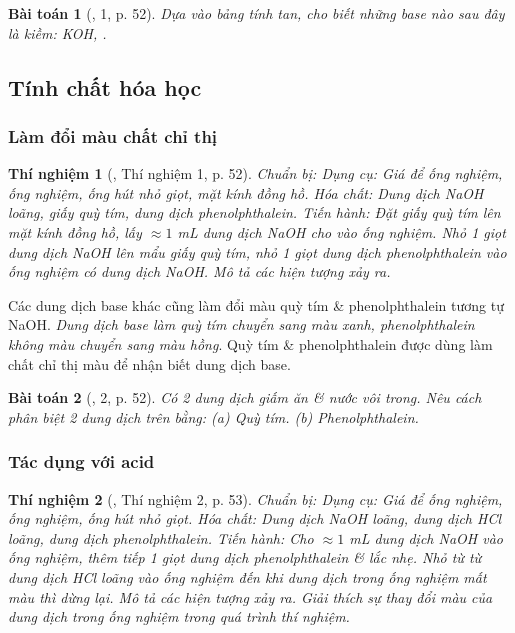 \documentclass{article}
\newtheorem{baitoan}{Bài toán}
\newtheorem{thinghiem}{Thí nghiệm}
\begin{document}
\begin{baitoan}[\cite{SGK_KHTN_8_Canh_Dieu}, 1, p. 52]
	Dựa vào bảng tính tan, cho biết những base nào sau đây là kiềm: \emph{KOH, }.
\end{baitoan}

\subsection{Tính chất hóa học}

\subsubsection{Làm đổi màu chất chỉ thị}

\begin{thinghiem}[\cite{SGK_KHTN_8_Canh_Dieu}, Thí nghiệm 1, p. 52]
	\emph{Chuẩn bị:} Dụng cụ: Giá để ống nghiệm, ống nghiệm, ống hút nhỏ giọt, mặt kính đồng hồ. Hóa chất: Dung dịch \emph{NaOH} loãng, giấy quỳ tím, dung dịch phenolphthalein. \emph{Tiến hành:} Đặt giấy quỳ tím lên mặt kính đồng hồ, lấy $\approx1$ \emph{mL} dung dịch \emph{NaOH} cho vào ống nghiệm. Nhỏ 1 giọt dung dịch \emph{NaOH} lên mẩu giấy quỳ tím, nhỏ 1 giọt dung dịch phenolphthalein vào ống nghiệm có dung dịch \emph{NaOH}. Mô tả các hiện tượng xảy ra.
\end{thinghiem}
Các dung dịch base khác cũng làm đổi màu quỳ tím \& phenolphthalein tương tự NaOH. \textit{Dung dịch base làm quỳ tím chuyển sang màu xanh, phenolphthalein không màu chuyển sang màu hồng}. Quỳ tím \& phenolphthalein được dùng làm chất chỉ thị màu để nhận biết dung dịch base.

\begin{baitoan}[\cite{SGK_KHTN_8_Canh_Dieu}, 2, p. 52]
	Có 2 dung dịch giấm ăn \& nước vôi trong. Nêu cách phân biệt 2 dung dịch trên bằng: (a) Quỳ tím. (b) Phenolphthalein.
\end{baitoan}

\subsubsection{Tác dụng với acid}

\begin{thinghiem}[\cite{SGK_KHTN_8_Canh_Dieu}, Thí nghiệm 2, p. 53]
	\emph{Chuẩn bị:} Dụng cụ: Giá để ống nghiệm, ống nghiệm, ống hút nhỏ giọt. Hóa chất: Dung dịch \emph{NaOH} loãng, dung dịch \emph{HCl} loãng, dung dịch phenolphthalein. \emph{Tiến hành:} Cho $\approx1$ \emph{mL} dung dịch \emph{NaOH} vào ống nghiệm, thêm tiếp 1 giọt dung dịch phenolphthalein \& lắc nhẹ. Nhỏ từ từ dung dịch \emph{HCl} loãng vào ống nghiệm đến khi dung dịch trong ống nghiệm mất màu thì dừng lại. Mô tả các hiện tượng xảy ra. Giải thích sự thay đổi màu của dung dịch trong ống nghiệm trong quá trình thí nghiệm.
\end{thinghiem}
\end{document}
